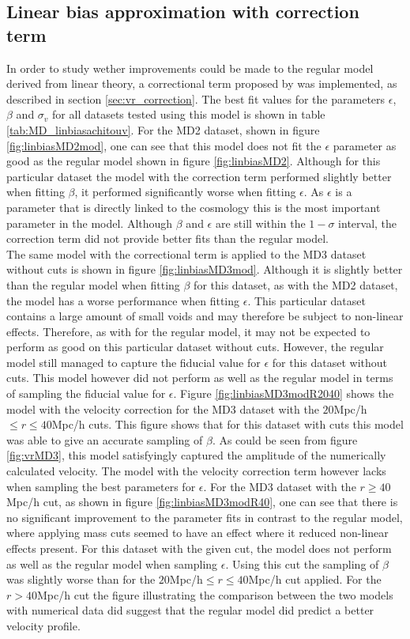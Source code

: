 \subsection{Linear bias approximation with correction term}
In order to study wether improvements could be made to the regular model derived from linear theory, a correctional term proposed by \cite{Achitouv_streaming} was implemented, as described in section \ref{sec:vr_correction}. The best fit values for the parameters $\epsilon$, $\beta$ and $\sigma_v$ for all datasets tested using this model is shown in table \ref{tab:MD_linbiasachitouv}. For the MD2 dataset, shown in figure \ref{fig:linbiasMD2mod}, one can see that this model does not fit the $\epsilon$ parameter as good as the regular model shown in figure \ref{fig:linbiasMD2}. Although for this particular dataset the model with the correction term performed slightly better when fitting $\beta$, it performed significantly worse when fitting $\epsilon$. As $\epsilon$ is a  parameter that is directly linked to the cosmology this is the most important parameter in the model. Although $\beta$ and $\epsilon$ are still within the $1-\sigma$ interval, the correction term did not provide better fits than the regular model.\\\indent
The same model with the correctional term is applied to the MD3 dataset without cuts is shown in figure \ref{fig:linbiasMD3mod}. Although it is slightly better than the regular model when fitting $\beta$ for this dataset, as with the MD2 dataset, the model has a worse performance when fitting $\epsilon$. This particular dataset contains a large amount of small voids and may therefore be subject to non-linear effects. Therefore, as with for the regular model, it may not be expected to perform as good on this particular dataset without cuts. However, the regular model still managed to 
capture the fiducial value for $\epsilon$ for this dataset without cuts. This model however did not perform as well as the regular model in terms of sampling the fiducial value for $\epsilon$.
Figure \ref{fig:linbiasMD3modR2040} shows the model with the velocity correction for the MD3 dataset with the $20$Mpc/h$\leq r\leq 40$Mpc/h cuts. This figure shows that for this dataset with cuts this model was able to give an accurate sampling of $\beta$. As could be seen from figure \ref{fig:vrMD3}, this model satisfyingly captured the amplitude of the numerically calculated velocity. The model with the velocity correction term however lacks when sampling the best parameters for $\epsilon$. For the MD3 dataset with the $r \geq 40$Mpc/h cut, as shown in figure \ref{fig:linbiasMD3modR40}, one can see that there is no significant improvement to the parameter fits in contrast to the regular model, where applying mass cuts seemed to have an effect where it reduced non-linear effects present. For this dataset with the given cut, the model does not perform as well as the regular model when sampling $\epsilon$. Using this cut the sampling of $\beta$ was slightly worse than for the $20$Mpc/h$\leq r\leq 40$Mpc/h cut applied. For the $r>40$Mpc/h cut the figure illustrating the comparison between the two models with numerical data did suggest that the regular model did predict a better velocity profile.\\\indent

